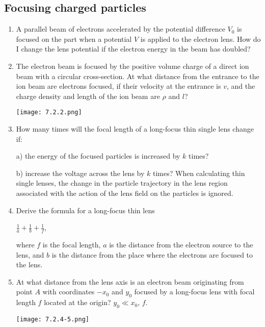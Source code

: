 \documentclass{article}
\begin{document}
\subsection{Focusing charged particles}
\begin{enumerate}[label=7.2.\arabic*]


\item A parallel beam of electrons accelerated by the potential difference $V_0$ is focused on the part when a potential $V$ is applied to the electron lens. How do I change the lens potential if the electron energy in the beam has doubled?

\item The electron beam is focused by the positive volume charge of a direct ion beam with a circular cross-section. At what distance from the entrance to the ion beam are electrons focused, if their velocity at the entrance is $v$, and the charge density and length of the ion beam are $\rho$ and $l$?

\begin{center}
    \texttt{[image: 7.2.2.png]}
\end{center}

\item How many times will the focal length of a long-focus thin single lens change if: 

a) the energy of the focused particles is increased by $k$ times? 

b) increase the voltage across the lens by $k$ times? When calculating thin single lenses, the change in the particle trajectory in the lens region associated with the action of the lens field on the particles is ignored.

\item Derive the formula for a long-focus thin lens 

$\frac{1}{a} + \frac{1}{b} + \frac{1}{f}$,

where $f$ is the focal length, $a$ is the distance from the electron source to the lens, and $b$ is the distance from the place where the electrons are focused to the lens.

\item At what distance from the lens axis is an electron beam originating from point $A$ with coordinates $-x_0$ and $y_0$ focused by a long-focus lens with focal length $f$ located at the origin? $y_0 \ll x_0$, $f$.

\begin{center}
    \texttt{[image: 7.2.4-5.png]}
\end{center}


\end{enumerate}
\end{document}
